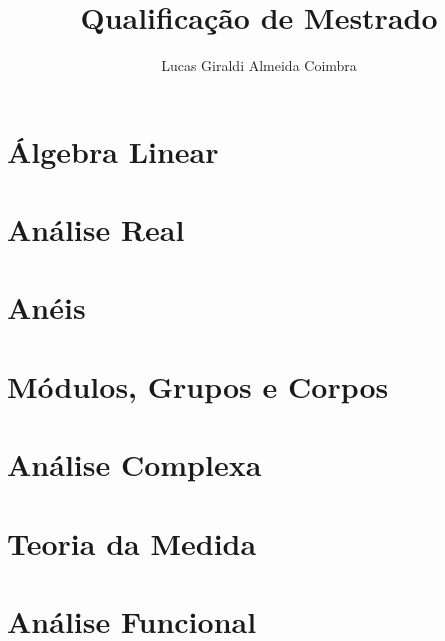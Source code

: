 \documentclass{article}
\title{Qualificação de Mestrado}
\author{Lucas Giraldi Almeida Coimbra}
\begin{document}
\maketitle
\tableofcontents

\section{Álgebra Linear}


\setcounter{definition}{0}
\setcounter{equation}{0}

\section{Análise Real}


\setcounter{definition}{0}

\section{Anéis}

% 
\setcounter{definition}{0}
\setcounter{equation}{0}

\section{Módulos, Grupos e Corpos}

% 
\setcounter{definition}{0}
\setcounter{equation}{0}

\section{Análise Complexa}

% 
\setcounter{definition}{0}

\section{Teoria da Medida}

% 
\setcounter{definition}{0}

\section{Análise Funcional}

% 
\setcounter{definition}{0}
\end{document}
